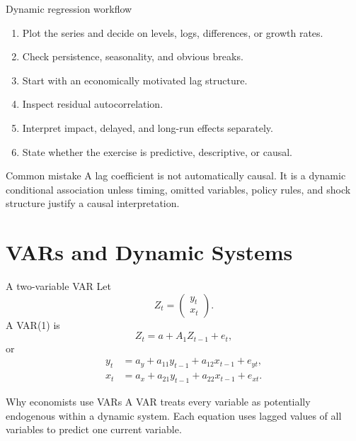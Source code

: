 \documentclass[10pt]{beamer}
\begin{document}
\begin{frame}{Dynamic regression workflow}
\small
\begin{enumerate}
  \item Plot the series and decide on levels, logs, differences, or growth rates.
  \item Check persistence, seasonality, and obvious breaks.
  \item Start with an economically motivated lag structure.
  \item Inspect residual autocorrelation.
  \item Interpret impact, delayed, and long-run effects separately.
  \item State whether the exercise is predictive, descriptive, or causal.
\end{enumerate}

\pause
\begin{alertblock}{Common mistake}
A lag coefficient is not automatically causal. It is a dynamic conditional association unless timing, omitted variables, policy rules, and shock structure justify a causal interpretation.
\end{alertblock}
\end{frame}

\section{VARs and Dynamic Systems}

\begin{frame}{A two-variable VAR}
\label{slide:var_setup}
\small
Let
\[
Z_t=
\begin{pmatrix}
y_t\\
x_t
\end{pmatrix}.
\]
A VAR(1) is
\[
Z_t=a+A_1Z_{t-1}+e_t,
\]
or
\begin{align*}
y_t&=a_y+a_{11}y_{t-1}+a_{12}x_{t-1}+e_{yt},\\
x_t&=a_x+a_{21}y_{t-1}+a_{22}x_{t-1}+e_{xt}.
\end{align*}

\pause
\begin{block}{Why economists use VARs}
A VAR treats every variable as potentially endogenous within a dynamic system. Each equation uses lagged values of all variables to predict one current variable.
\end{block}
\end{frame}
\end{document}
